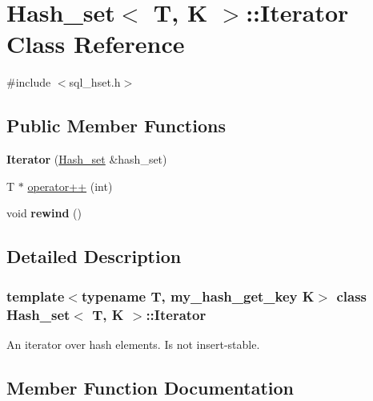 \hypertarget{classHash__set_1_1Iterator}{}\section{Hash\+\_\+set$<$ T, K $>$\+:\+:Iterator Class Reference}
\label{classHash__set_1_1Iterator}


{\ttfamily \#include $<$sql\+\_\+hset.\+h$>$}

\subsection*{Public Member Functions}
\begin{DoxyCompactItemize}
\item 
\mbox{\label{classHash__set_1_1Iterator_a09e4b5d64517866c264eac4a81560bf7}} 
{\bfseries Iterator} (\mbox{\hyperlink{classHash__set}{Hash\+\_\+set}} \&hash\+\_\+set)
\item 
T $\ast$ \mbox{\hyperlink{classHash__set_1_1Iterator_ade1f3bd42f44fdacf37b959a83d22264}{operator++}} (int)
\item 
\mbox{\label{classHash__set_1_1Iterator_a7e47e87797937673ed8ada3735df0ed0}} 
void {\bfseries rewind} ()
\end{DoxyCompactItemize}


\subsection{Detailed Description}
\subsubsection*{template$<$typename T, my\+\_\+hash\+\_\+get\+\_\+key K$>$\newline
class Hash\+\_\+set$<$ T, K $>$\+::\+Iterator}

An iterator over hash elements. Is not insert-\/stable. 

\subsection{Member Function Documentation}
\mbox{\label{classHash__set_1_1Iterator_ade1f3bd42f44fdacf37b959a83d22264}} 
